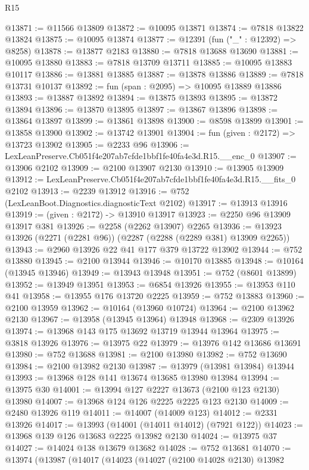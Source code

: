 \begin{lexlean}{R15}
\begin{coremodule}
@13871 := @11566 @13809
@13872 := @10095 @13871
@13874 := @7818 @13822 @13824
@13875 := @10095 @13874
@13877 := @12391 (fun ("_" : @12392) => @8258)
@13878 := @13877 @2183
@13880 := @7818 @13688 @13690
@13881 := @10095 @13880
@13883 := @7818 @13709 @13711
@13885 := @10095 @13883 @10117
@13886 := @13881 @13885
@13887 := @13878 @13886
@13889 := @7818 @13731 @10137
@13892 := fun (span : @2095) => @10095 @13889 @13886
@13893 := @13887 @13892
@13894 := @13875 @13893
@13895 := @13872 @13894
@13896 := @13870 @13895
@13897 := @13867 @13896
@13898 := @13864 @13897
@13899 := @13861 @13898
@13900 := @8598 @13899
@13901 := @13858 @13900
@13902 := @13742 @13901
@13904 := fun (given : @2172) => @13723 @13902
@13905 := @2233 @96
@13906 := LexLeanPreserve.Cb051f4e207ab7cfde1bbf1fe40fa4e3d.R15.__enc_0
@13907 := @13906 @2102
@13909 := @2100 @13907 @2130
@13910 := @13905 @13909
@13912 := LexLeanPreserve.Cb051f4e207ab7cfde1bbf1fe40fa4e3d.R15.__fits_0 @2102
@13913 := @2239 @13912
@13916 := @752 (LexLeanBoot.Diagnostics.diagnosticText @2102)
@13917 := @13913 @13916
@13919 := (given : @2172) -> @13910 @13917
@13923 := @2250 @96 @13909 @13917 @381
@13926 := @2258 (@2262 @13907) @2265
@13936 := @13923 @13926 (@2271 (@2281 @96)) (@2287 (@2288 (@2289 @381) @13909 @2265))
@13943 := @2960 @13926 @22 @41 @177 @379 @13722 @13902
@13944 := @752 @13880
@13945 := @2100 @13944
@13946 := @10170 @13885
@13948 := @10164 (@13945 @13946)
@13949 := @13943 @13948
@13951 := @752 (@8601 @13899)
@13952 := @13949 @13951
@13953 := @6854 @13926
@13955 := @13953 @110 @41
@13958 := @13955 @176 @13720 @2225
@13959 := @752 @13883
@13960 := @2100 @13959
@13962 := @10164 (@13960 @10724)
@13964 := @2100 @13962 @2130
@13967 := @13958 (@13945 @13964) @13948
@13968 := @2309 @13926
@13974 := @13968 @143 @175 @13692 @13719 @13944 @13964
@13975 := @3818 @13926
@13976 := @13975 @22
@13979 := @13976 @142 @13686 @13691
@13980 := @752 @13688
@13981 := @2100 @13980
@13982 := @752 @13690
@13984 := @2100 @13982 @2130
@13987 := @13979 (@13981 @13984) @13944
@13993 := @13968 @128 @141 @13674 @13685 @13980 @13984
@13994 := @13975 @30
@14001 := @13994 @127 @2227 @13673 (@2100 @123 @2130) @13980
@14007 := @13968 @124 @126 @2225 @2225 @123 @2130
@14009 := @2480 @13926 @119
@14011 := @14007 (@14009 @123)
@14012 := @2331 @13926
@14017 := @13993 (@14001 (@14011 @14012) (@7921 @122))
@14023 := @13968 @139 @126 @13683 @2225 @13982 @2130
@14024 := @13975 @37
@14027 := @14024 @138 @13679 @13682
@14028 := @752 @13681
@14070 := @13974
    (@13987
      (@14017
        (@14023
          (@14027
            (@2100 @14028 @2130)
            @13982

\end{coremodule}
\end{lexlean}
